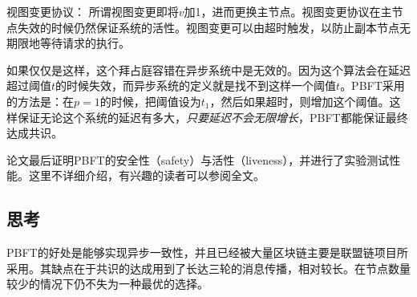 视图变更协议：	所谓视图变更即将$v$加1，进而更换主节点。视图变更协议在主节点失效的时候仍然保证系统的活性。视图变更可以由超时触发，以防止副本节点无期限地等待请求的执行。

如果仅仅是这样，这个拜占庭容错在异步系统中是无效的。因为这个算法会在延迟超过阈值$t$的时候失效，而异步系统的定义就是找不到这样一个阈值$t$。PBFT采用的方法是：在$p=1$的时候，把阈值设为$t_1$，然后如果超时，则增加这个阈值。这样保证无论这个系统的延迟有多大，\emph{只要延迟不会无限增长}，PBFT都能保证最终达成共识。

论文最后证明PBFT的安全性（safety）与活性（liveness），并进行了实验测试性能。这里不详细介绍，有兴趣的读者可以参阅全文。

\subsection{思考}
PBFT的好处是能够实现异步一致性，并且已经被大量区块链主要是联盟链项目所采用。其缺点在于共识的达成用到了长达三轮的消息传播，相对较长。在节点数量较少的情况下仍不失为一种最优的选择。
